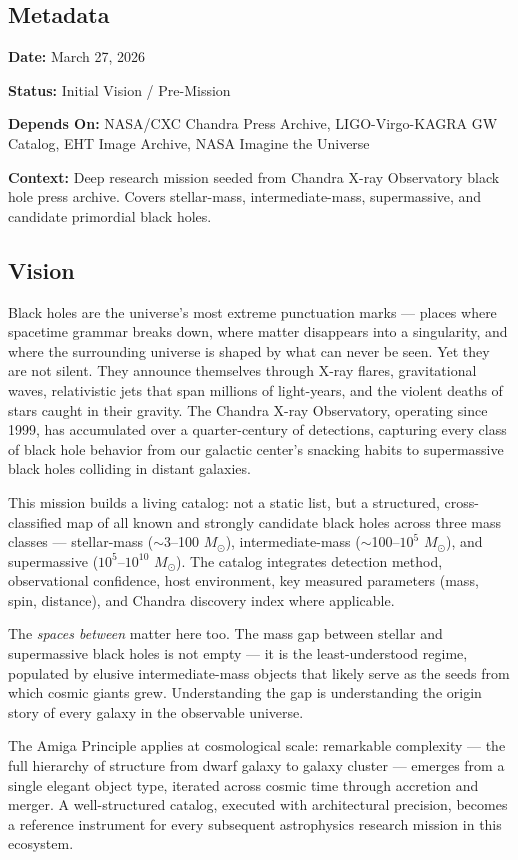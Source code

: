 \documentclass[11pt,letterpaper]{article}
\newcommand{\metafield}[2]{\textbf{\sffamily #1} #2\par}
\begin{document}
\subsection{Metadata}

\metafield{Date:}{March 27, 2026}
\metafield{Status:}{Initial Vision / Pre-Mission}
\metafield{Depends On:}{NASA/CXC Chandra Press Archive, LIGO-Virgo-KAGRA GW Catalog, EHT Image Archive, NASA Imagine the Universe}
\metafield{Context:}{Deep research mission seeded from Chandra X-ray Observatory black hole press archive. Covers stellar-mass, intermediate-mass, supermassive, and candidate primordial black holes.}

\subsection{Vision}

Black holes are the universe's most extreme punctuation marks --- places where spacetime grammar breaks down, where matter disappears into a singularity, and where the surrounding universe is shaped by what can never be seen. Yet they are not silent. They announce themselves through X-ray flares, gravitational waves, relativistic jets that span millions of light-years, and the violent deaths of stars caught in their gravity. The Chandra X-ray Observatory, operating since 1999, has accumulated over a quarter-century of detections, capturing every class of black hole behavior from our galactic center's snacking habits to supermassive black holes colliding in distant galaxies.

This mission builds a living catalog: not a static list, but a structured, cross-classified map of all known and strongly candidate black holes across three mass classes --- stellar-mass ($\sim$3--100 $M_\odot$), intermediate-mass ($\sim$100--$10^5$ $M_\odot$), and supermassive ($10^5$--$10^{10}$ $M_\odot$). The catalog integrates detection method, observational confidence, host environment, key measured parameters (mass, spin, distance), and Chandra discovery index where applicable.

The \textit{spaces between} matter here too. The mass gap between stellar and supermassive black holes is not empty --- it is the least-understood regime, populated by elusive intermediate-mass objects that likely serve as the seeds from which cosmic giants grew. Understanding the gap is understanding the origin story of every galaxy in the observable universe.

The Amiga Principle applies at cosmological scale: remarkable complexity --- the full hierarchy of structure from dwarf galaxy to galaxy cluster --- emerges from a single elegant object type, iterated across cosmic time through accretion and merger. A well-structured catalog, executed with architectural precision, becomes a reference instrument for every subsequent astrophysics research mission in this ecosystem.
\end{document}
